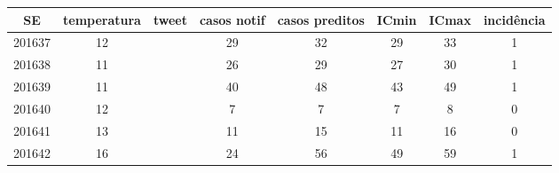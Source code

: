 \begin{tabular}{c|ccccccc}
  \hline
SE & temperatura & tweet & casos notif & casos preditos & ICmin & ICmax & incidência \\ 
  \hline
201637 & 12 &  & 29 & 32 & 29 & 33 & 1 \\ 
  201638 & 11 &  & 26 & 29 & 27 & 30 & 1 \\ 
  201639 & 11 &  & 40 & 48 & 43 & 49 & 1 \\ 
  201640 & 12 &  & 7 & 7 & 7 & 8 & 0 \\ 
  201641 & 13 &  & 11 & 15 & 11 & 16 & 0 \\ 
  201642 & 16 &  & 24 & 56 & 49 & 59 & 1 \\ 
   \hline
\end{tabular}
